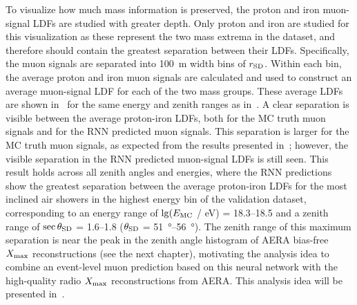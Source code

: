 To visualize how much mass information is preserved, the proton and iron muon-signal LDFs are studied with greater depth.
Only proton and iron are studied for this visualization as these represent the two mass extrema in the dataset, and therefore should contain the greatest separation between their LDFs.
Specifically, the muon signals are separated into \qty{100}{\meter} width bins of $r_{\rm SD}$.
Within each bin, the average proton and iron muon signals are calculated and used to construct an average muon-signal LDF for each of the two mass groups.
These average LDFs are shown in~ for the same energy and zenith ranges as in~.
A clear separation is visible between the average proton-iron LDFs, both for the MC truth muon signals and for the RNN predicted muon signals.
This separation is larger for the MC truth muon signals, as expected from the results presented in~; however, the visible separation in the RNN predicted muon-signal LDFs is still seen.
This result holds across all zenith angles and energies, where the RNN predictions show the greatest separation between the average proton-iron LDFs for the most inclined air showers in the highest energy bin of the validation dataset, corresponding to an energy range of $\lg(E_{\rm MC}$ / eV) = \numrange{18.3}{18.5} and a zenith range of $\sec\theta_{\rm SD}$ = \numrange{1.6}{1.8} ($\theta_{\rm SD}$ = \qtyrange{51}{56}{\degree}).
The zenith range of this maximum separation is near the peak in the zenith angle histogram of AERA bias-free $X_{\rm max}$ reconstructions (see the next chapter), motivating the analysis idea to combine an event-level muon prediction based on this neural network with the high-quality radio $X_{\rm max}$ reconstructions from AERA.
This analysis idea will be presented in~.




